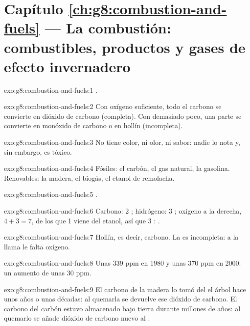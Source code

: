 \section*{Capítulo \ref{ch:g8:combustion-and-fuels} --- La combustión: combustibles, productos y gases de efecto invernadero}

\begin{solution}{exo:g8:combustion-and-fuels:1}
.
\end{solution}

\begin{solution}{exo:g8:combustion-and-fuels:2}
Con oxígeno suficiente, todo el carbono se convierte en dióxido de
carbono (completa). Con demasiado poco, una parte se convierte en
monóxido de carbono o en hollín (incompleta).
\end{solution}

\begin{solution}{exo:g8:combustion-and-fuels:3}
No tiene color, ni olor, ni sabor: nadie lo nota y, sin embargo, es
tóxico.
\end{solution}

\begin{solution}{exo:g8:combustion-and-fuels:4}
Fósiles: el carbón, el gas natural, la gasolina. Renovables: la madera,
el biogás, el etanol de remolacha.
\end{solution}

\begin{solution}{exo:g8:combustion-and-fuels:5}
.
\end{solution}

\begin{solution}{exo:g8:combustion-and-fuels:6}
Carbono: 2 ; hidrógeno: 3 ; oxígeno a la derecha, $4 + 3 =
7$, de los que 1 viene del etanol, así que 3 :
.
\end{solution}

\begin{solution}{exo:g8:combustion-and-fuels:7}
Hollín, es decir, carbono. La  es incompleta: a la llama le
falta oxígeno.
\end{solution}

\begin{solution}{exo:g8:combustion-and-fuels:8}
Unas 339 ppm en 1980 y unas 370 ppm en 2000: un aumento de unas 30 ppm.
\end{solution}

\begin{solution}{exo:g8:combustion-and-fuels:9}
El carbono de la madera lo tomó del  el árbol hace unos años o unas
décadas: al quemarla se devuelve ese dióxido de carbono. El carbono del
carbón estuvo almacenado bajo tierra durante millones de años: al
quemarlo se añade dióxido de carbono nuevo al .
\end{solution}

